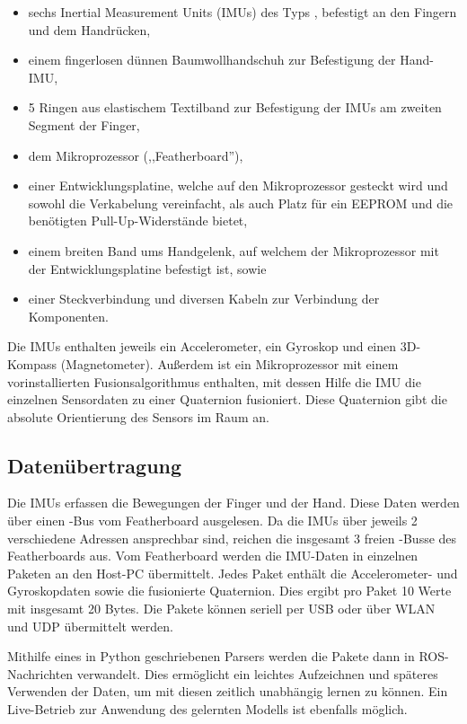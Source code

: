\begin{itemize}
    \item sechs Inertial Measurement Units (IMUs) des Typs , befestigt an den Fingern und dem Hand\-rücken,
    \item einem fingerlosen dünnen Baumwollhandschuh zur Befestigung der Hand-IMU,
    \item 5 Ringen aus elastischem Textilband zur Befestigung der IMUs am zweiten Segment der Finger,
    \item dem Mikroprozessor  (,,Featherboard''),
    \item einer Entwicklungsplatine, welche auf den Mikroprozessor gesteckt wird und sowohl die Verkabelung vereinfacht, als auch Platz für ein EEPROM und die benötigten Pull-Up-Widerstände bietet,
    \item einem breiten Band ums Handgelenk, auf welchem der Mikroprozessor mit der Entwicklungsplatine befestigt ist, sowie
    \item einer Steckverbindung und diversen Kabeln zur Verbindung der Komponenten.
\end{itemize}

Die IMUs enthalten jeweils ein Accelerometer, ein Gyroskop und einen 3D-Kompass (Magnetometer). Außerdem ist ein Mikroprozessor mit einem vorinstallierten Fusionsalgorithmus enthalten, mit dessen Hilfe die IMU die einzelnen Sensordaten zu einer Quaternion fusioniert. Diese Quaternion gibt die absolute Orientierung des Sensors im Raum an.

\subsection{Datenübertragung}

Die IMUs erfassen die Bewegungen der Finger und der Hand. Diese Daten werden über einen \iic-Bus vom Featherboard ausgelesen. Da die IMUs über jeweils 2 verschiedene Adressen ansprechbar sind, reichen die insgesamt 3 freien \iic-Busse des Featherboards aus. Vom Featherboard werden die IMU-Daten in einzelnen Paketen an den Host-PC übermittelt. Jedes Paket enthält die Accelerometer- und Gyroskopdaten sowie die fusionierte Quaternion. Dies ergibt pro Paket 10 Werte mit insgesamt 20 Bytes. Die Pakete können seriell per USB oder über WLAN und UDP übermittelt werden.

Mithilfe eines in Python geschriebenen Parsers werden die Pakete dann in ROS-Nach\-rich\-ten verwandelt. Dies ermöglicht ein leichtes Aufzeichnen und späteres Verwenden der Daten, um mit diesen zeitlich unabhängig lernen zu können. Ein Live-Betrieb zur Anwendung des gelernten Modells ist ebenfalls möglich.

